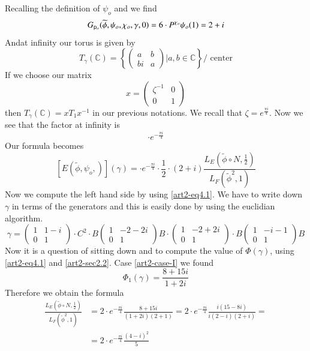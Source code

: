 Recalling the definition of $\psi_{o}$ and we find
$$
G_{\mathsf{p}_{o}}(\widetilde{\phi},\psi_{o},\chi_{o},\gamma,0)=6\cdot P^{\chi_{o}}\psi_{o}(1)=2+i
$$
And\pageoriginale at infinity our torus is given by
$$
T_{\gamma}(\mathbb{C})=\left\{\left(\begin{matrix} a & b\\ bi & a\end{matrix}\right)\Big|a,b\in \mathbb{C}\right\}\Big/\text{~center}
$$
If we choose our matrix
$$
x=\left(\begin{matrix} \zeta^{-1} & 0\\ 0 & 1\end{matrix}\right)
$$
then $T_{\gamma}(\mathbb{C})=xT_{1}x^{-1}$ in our previous notations. We recall that $\zeta=e^{\frac{\pi i}{4}}$. Now we see that the factor at infinity is
$$
\cdot e^{-\frac{\pi i}{4}}
$$
Our formula becomes
$$
[E(\widetilde{\phi},\psi_{o},)](\gamma)=\cdot e^{-\frac{\pi i}{4}}\cdot \frac{1}{2}\cdot (2+i)\frac{L_{E}\left(\widetilde{\phi}\circ N,\frac{1}{2}\right)}{L_{F}(\widetilde{\phi}^{2},1)}
$$
Now we compute the left hand side by using \eqref{art2-eq4.1}. We have to write down $\gamma$ in terms of the generators and this is easily done by using the euclidian algorithm.
$$
\gamma=\left(\begin{matrix} 1 & 1-i\\
0 & 1
\end{matrix}\right)\cdot C^{2}\cdot B\left(\begin{matrix} 1 & -2-2i\\ 0 & 1\end{matrix}\right)B\cdot \left(\begin{matrix} 1 & -2+2i\\ 0 & 1\end{matrix}\right)\cdot B\left(\begin{matrix} 1 & -i-1\\ 0 & 1\end{matrix}\right)B
$$
Now it is a question of sitting down and to compute the value of $\Phi(\gamma)$, using \eqref{art2-eq4.1} and \eqref{art2-sec2.2}. Case \ref{art2-case-I} we found
$$
\Phi_{1}(\gamma)=\frac{8+15i}{1+2i}
$$
Therefore we obtain the formula
\begin{align*}
\frac{L_{E}\left(\widetilde{\phi}\circ N,\frac{1}{2}\right)}{L_{F}(\widetilde{\phi}^{2},1)} &= 2\cdot e^{-\frac{\pi i}{4}}\frac{8+15i}{(1+2i)(2+1)}=2\cdot e^{-\frac{\pi i}{4}}\frac{i(15-8i)}{i(2-i)(2+i)}=\\[4pt]
&= 2\cdot e^{-\frac{\pi i}{4}}\frac{(4-i)^{2}}{5}
\end{align*}

